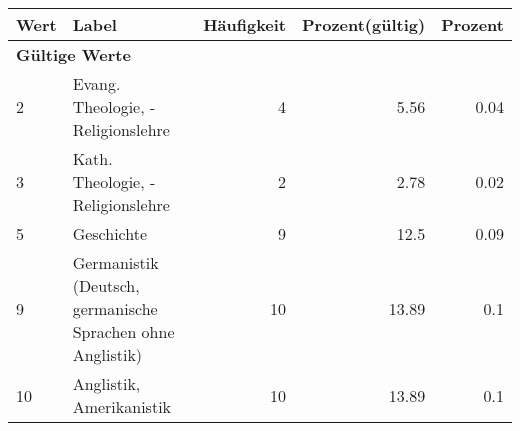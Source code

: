      \begin{longtable}{lXrrr}
     \toprule
     \textbf{Wert} & \textbf{Label} & \textbf{Häufigkeit} & \textbf{Prozent(gültig)} & \textbf{Prozent} \\
     \endhead
     \midrule
     \multicolumn{5}{l}{\textbf{Gültige Werte}}\\

     2 &
     \multicolumn{1}{X}{ Evang. Theologie, -Religionslehre   } &


       \num{4} &
       \num[round-mode=places,round-precision=2]{5,56} &
         \num[round-mode=places,round-precision=2]{0,04} \\

     3 &
     \multicolumn{1}{X}{ Kath. Theologie, -Religionslehre   } &


       \num{2} &
       \num[round-mode=places,round-precision=2]{2,78} &
         \num[round-mode=places,round-precision=2]{0,02} \\

     5 &
     \multicolumn{1}{X}{ Geschichte   } &


       \num{9} &
       \num[round-mode=places,round-precision=2]{12,5} &
         \num[round-mode=places,round-precision=2]{0,09} \\

     9 &
     \multicolumn{1}{X}{ Germanistik (Deutsch, germanische Sprachen ohne Anglistik)   } &


       \num{10} &
       \num[round-mode=places,round-precision=2]{13,89} &
         \num[round-mode=places,round-precision=2]{0,1} \\

     10 &
     \multicolumn{1}{X}{ Anglistik, Amerikanistik   } &


       \num{10} &
       \num[round-mode=places,round-precision=2]{13,89} &
         \num[round-mode=places,round-precision=2]{0,1} \\


\end{longtable}
